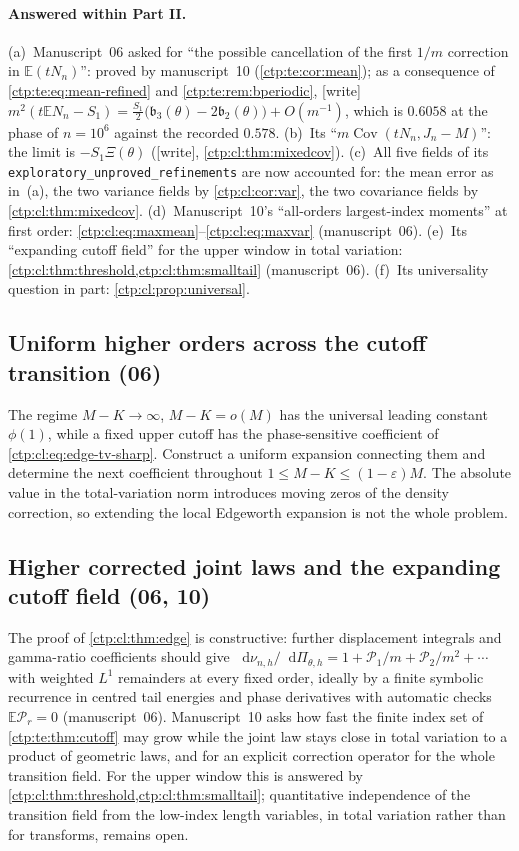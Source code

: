 \documentclass[11pt,a4paper]{article}
\numberwithin{equation}{section}
\theoremstyle{definition}
\theoremstyle{remark}
\newcommand{\dd}{\mathop{}\!\mathrm d}
\newcommand{\E}{\mathbb E}
\DeclareMathOperator{\Cov}{Cov}
\begin{document}
\paragraph{Answered within Part II.}
(a)~Manuscript~06 asked for ``the possible cancellation of the first $1/m$
correction in $\E(tN_n)$'': proved by manuscript~10
(\cref{ctp:te:cor:mean}); as a consequence of \eqref{ctp:te:eq:mean-refined}
and \cref{ctp:te:rem:bperiodic}, [write]
$m^2(t\E N_n-S_1)=\frac{S_1}2\bigl(\mathfrak b_3(\theta)-2\mathfrak b_2(\theta)\bigr)+O(m^{-1})$,
which is $0.6058$ at the phase of $n=10^6$ against the recorded
$0.578$. (b)~Its ``$m\Cov(tN_n,J_n-M)$'': the limit is
$-S_1\Xi(\theta)$ ([write], \cref{ctp:cl:thm:mixedcov}). (c)~All five
fields of its \texttt{exploratory\_unproved\_refinements} are now accounted
for: the mean error as in~(a), the two variance fields by
\cref{ctp:cl:cor:var}, the two covariance fields by
\cref{ctp:cl:thm:mixedcov}. (d)~Manuscript~10's ``all-orders largest-index
moments'' at first order: \eqref{ctp:cl:eq:maxmean}--\eqref{ctp:cl:eq:maxvar}
(manuscript~06). (e)~Its ``expanding cutoff field'' for the upper window in
total variation: \cref{ctp:cl:thm:threshold,ctp:cl:thm:smalltail}
(manuscript~06). (f)~Its universality question in part:
\cref{ctp:cl:prop:universal}.

\subsection{Uniform higher orders across the cutoff transition (06)}
The regime $M-K\to\infty$, $M-K=o(M)$ has the universal leading constant
$\phi(1)$, while a fixed upper cutoff has the phase-sensitive coefficient of
\eqref{ctp:cl:eq:edge-tv-sharp}. Construct a uniform expansion connecting
them and determine the next coefficient throughout
$1\le M-K\le(1-\varepsilon)M$. The absolute value in the total-variation norm
introduces moving zeros of the density correction, so extending the local
Edgeworth expansion is not the whole problem.

\subsection{Higher corrected joint laws and the expanding cutoff field (06, 10)}
The proof of \cref{ctp:cl:thm:edge} is constructive: further displacement
integrals and gamma-ratio coefficients should give
$\dd\nu_{n,h}/\dd\Pi_{\theta,h}=1+\mathcal P_1/m+\mathcal P_2/m^2+\cdots$ with
weighted $L^1$ remainders at every fixed order, ideally by a finite symbolic
recurrence in centred tail energies and phase derivatives with automatic
checks $\E\mathcal P_r=0$ (manuscript~06). Manuscript~10 asks how fast the
finite index set of \cref{ctp:te:thm:cutoff} may grow while the joint law
stays close in total variation to a product of geometric laws, and for an
explicit correction operator for the whole transition field. For the upper
window this is answered by \cref{ctp:cl:thm:threshold,ctp:cl:thm:smalltail};
quantitative independence of the transition field from the low-index
length variables, in total variation rather than for transforms, remains
open.
\end{document}
